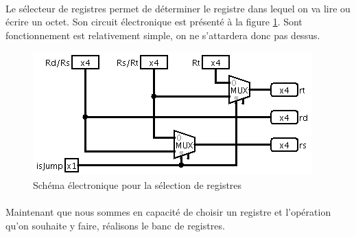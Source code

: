 \paragraph{}{
	Le sélecteur de registres permet de déterminer le registre
	dans lequel on va lire ou écrire un octet. Son circuit électronique
	est présenté à la figure \ref{selec_reg_circ}.
	Sont fonctionnement est relativement simple, on ne s’attardera donc
	pas dessus.
}

\begin{figure}[!h]
	\centering
	\includegraphics[scale=0.8,origin=c]{circuits/selec_reg.png}
	\caption{
		\label{selec_reg_circ}
		Sch\'{e}ma \'{e}lectronique pour la s\'{e}lection de registres
	}
\end{figure}

\paragraph{}{
	Maintenant que nous sommes en capacité de choisir un registre
	et l'opération qu'on souhaite y faire, réalisons le banc de
	registres.
}